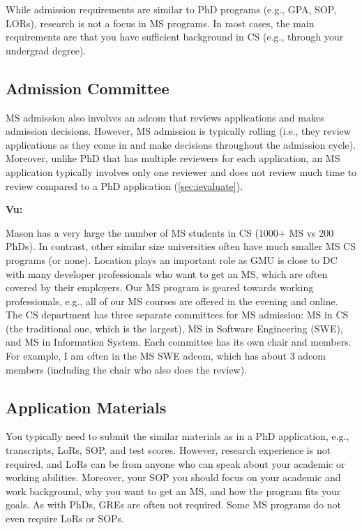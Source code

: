 \documentclass[oneside,11pt,dvipsnames]{book}
\newenvironment{commentbox}[1][]{
  \small
  \begin{mybox}
    {\small \textbf{#1}}
  }{
  \end{mybox}
}
\begin{document}
While admission requirements are similar to PhD programs (e.g., GPA, SOP, LORs), research is not a focus in MS programs. In most cases, the main requirements are that you have sufficient background in CS (e.g., through your undergrad degree). 

\subsection{Admission Committee}\label{sec:ms-adcom}
MS admission also involves an adcom that reviews applications and makes admission decisions. However, MS admission is typically rolling (i.e., they review applications as they come in and make decisions throughout the admission cycle).  Moreover, unlike PhD that has multiple reviewers for each application, an MS application typically involves only one reviewer and does not review much time to review compared to a PhD application (\autoref{sec:ievaluate}). 

\begin{commentbox}[Vu:]
    Mason has a very large the number of MS students in CS (1000+ MS vs 200 PhDs). In contrast, other similar size universities often have much smaller MS CS programs (or none). Location plays an important role as GMU is close to DC with many developer professionals who want to get an MS, which are often covered by their employers.  Our MS program is geared towards working professionals, e.g., all of our MS courses are offered in the evening and online.
    \\
    
    The CS department has three separate committees for MS admission: MS in CS (the traditional one, which is the largest), MS in Software Engineering (SWE), and MS in Information System. 
    Each committee has its own chair and members. For example, I am often in the MS SWE adcom, which has about 3 adcom members (including the chair who also does the review). 
\end{commentbox}





\subsection{Application Materials}

You typically need to submit the similar materials as in a PhD application, e.g., transcripts, LoRs, SOP, and test scores.  However, research experience is not required, and LoRs can be from anyone who can speak about your academic or working abilities. Moreover, your SOP you should focus on your academic and work background, why you want to get an MS, and how the program fits your goals. As with PhDs, GREs are often not required. Some MS programs do not even require LoRs or SOPs.  
\end{document}
